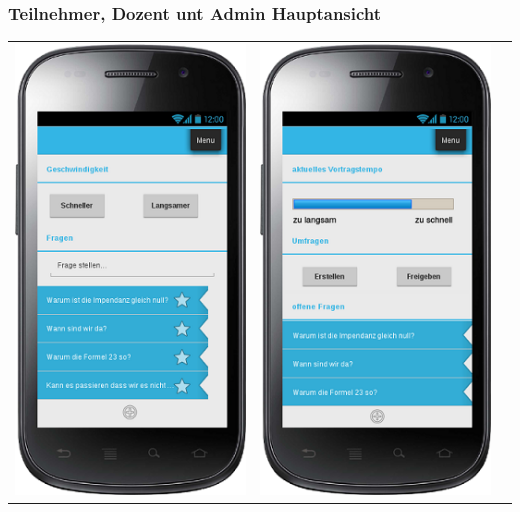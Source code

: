 \documentclass[german,a4paper]{beamer}
\begin{document}
\begin{frame}
\frametitle{Teilnehmer, Dozent unt Admin Hauptansicht}
\begin{tabular}{ccc}
  \includegraphics[height=0.75\textheight]{./mockups/mockup_main_teilnehmer.png}
  &
  \includegraphics[height=0.75\textheight]{./mockups/mockup_main_dozent.png}

\end{tabular}
\end{frame}
\end{document}

